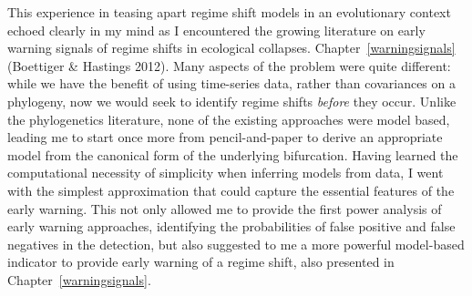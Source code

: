 This experience in teasing apart regime shift models in an evolutionary context echoed clearly in my mind as I encountered the growing literature on early warning signals of regime shifts in ecological collapses.  Chapter~\ref{warningsignals} (Boettiger \& Hastings 2012). Many aspects of the problem were quite different: while we have the benefit of using time-series data, rather than covariances on a phylogeny, now we would seek to identify regime shifts \emph{before} they occur. Unlike the phylogenetics literature, none of the existing approaches were model based, leading me to start once more from pencil-and-paper to derive an appropriate model from the canonical form of the underlying bifurcation.  Having learned the computational necessity of simplicity when inferring models from data, I went with the simplest approximation that could capture the essential features of the early warning.  This not only allowed me to provide the first power analysis of early warning approaches, identifying the probabilities of false positive and false negatives in the detection, but also suggested to me a more powerful model-based indicator to provide early warning of a regime shift, also presented in Chapter~\ref{warningsignals}. 







